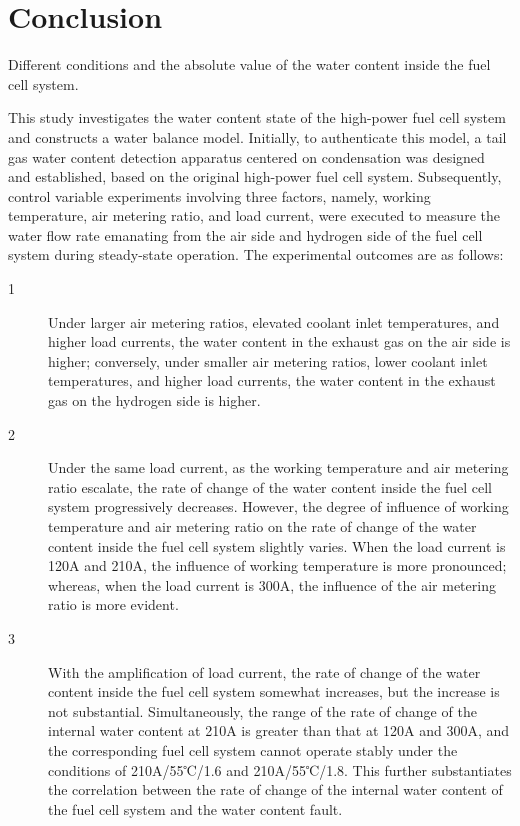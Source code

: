 \section{Conclusion}
Different conditions and the absolute value of the water content inside the fuel cell system.
\par
This study investigates the water content state of the high-power fuel cell system and constructs a water balance model. Initially, to authenticate this model, a tail gas water content detection apparatus centered on condensation was designed and established, based on the original high-power fuel cell system. Subsequently, control variable experiments involving three factors, namely, working temperature, air metering ratio, and load current, were executed to measure the water flow rate emanating from the air side and hydrogen side of the fuel cell system during steady-state operation. The experimental outcomes are as follows:
\begin{description}
    \item [1] Under larger air metering ratios, elevated coolant inlet temperatures, and higher load currents, the water content in the exhaust gas on the air side is higher; conversely, under smaller air metering ratios, lower coolant inlet temperatures, and higher load currents, the water content in the exhaust gas on the hydrogen side is higher.
    \item [2] Under the same load current, as the working temperature and air metering ratio escalate, the rate of change of the water content inside the fuel cell system progressively decreases. However, the degree of influence of working temperature and air metering ratio on the rate of change of the water content inside the fuel cell system slightly varies. When the load current is 120A and 210A, the influence of working temperature is more pronounced; whereas, when the load current is 300A, the influence of the air metering ratio is more evident.
    \item [3] With the amplification of load current, the rate of change of the water content inside the fuel cell system somewhat increases, but the increase is not substantial. Simultaneously, the range of the rate of change of the internal water content at 210A is greater than that at 120A and 300A, and the corresponding fuel cell system cannot operate stably under the conditions of 210A/55℃/1.6 and 210A/55℃/1.8. This further substantiates the correlation between the rate of change of the internal water content of the fuel cell system and the water content fault.
\end{description}